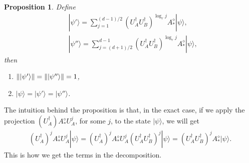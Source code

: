 \documentclass[11pt,letterpaper]{article}
\newcommand{\ket}[1]{|#1\rangle}
\newcommand{\ct}{^{\dagger}}
\DeclarePairedDelimiter{\norm}{\lVert}{\rVert}
\newcommand{\1}{\mathbb{1}}
\newtheorem{proposition}[theorem]{Proposition}
\theoremstyle{definition}
\begin{document}
\begin{proposition}
\label{prop:decomp_psi}
Define 
\begin{align}
	&\ket{\psi'} = \sum_{j=1}^{(d-1)/2} (U_A\ct U_B\ct)^{\log_r j} A_\ast^\diamond \ket{\psi},\\
	&\ket{\psi''} = \sum_{j=(d+1)/2}^{d-1} (U_A\ct U_B\ct)^{\log_r j} A_\ast^\diamond \ket{\psi},
\end{align}
then
\begin{enumerate}
	\item $\norm{\ket{\psi'}} = \norm{\ket{\psi''}} = 1$,
	\item $\ket{\psi} = \ket{\psi'} = \ket{\psi''}$.
\end{enumerate}
\end{proposition}
The intuition behind the proposition is that, in the exact case, if we apply the projection $(U_A\ct)A_\ast^\diamond U_A^j$, for some $j$, to the state $\ket{\psi}$,
we will get 
\begin{align}
	(U_A\ct)^j A_\ast^\diamond U_A^j \ket{\psi} = (U_A\ct)^j A_\ast^\diamond U_A^j (U_A\ct U_B\ct)^j \ket{\psi} = (U_A\ct U_B\ct)^j A_\ast^\diamond \ket{\psi}.
\end{align}
This is how we get the terms in the decomposition.
\end{document}
